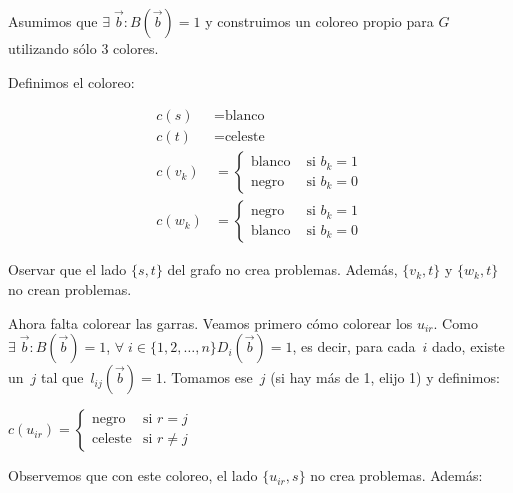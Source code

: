 \documentclass[10pt,a4paper]{article}
\begin{document}
Asumimos que $\exists\; \overrightarrow{b} : B(\overrightarrow{b}) = 1$ y construimos un coloreo propio para $G$ utilizando sólo 3 colores.

Definimos el coloreo:

\begin{center}
\begin{align*} c(s) &= \text{blanco}\\ c(t) &= \text{celeste} \\ c(v_k) &= \begin{cases} \text{blanco} & \text{ si } b_k = 1\\ \text{negro} & \text{ si } b_k = 0 \end{cases}\\ c(w_k) &= \begin{cases} \text{negro} & \text{ si } b_k = 1\\ \text{blanco} & \text{ si } b_k = 0 \end{cases} \end{align*}
\end{center}

Oservar que el lado $\{s, t\}$ del grafo no crea problemas. Además, $\{v_k, t\}$ y $\{w_k, t\}$ no crean problemas.

Ahora falta colorear las garras. Veamos primero cómo colorear los $u_{ir}$. Como $\exists\; \overrightarrow{b} : B(\overrightarrow{b}) = 1$, $\forall\; i \in \{1, 2, \dots, n\} D_i(\overrightarrow{b}) = 1$, es decir, para cada $i$ dado, existe un $j$ tal que $ l_{ij}(\overrightarrow{b}) = 1$. Tomamos ese $j$ (si hay más de 1, elijo 1) y definimos:

\begin{center}
$c(u_{ir})= \begin{cases} \text{negro} & \text{si } r = j\\ \text{celeste} & \text{si } r \neq j \end{cases}$
\end{center}

Observemos que con este coloreo, el lado $\{u_{ir}, s\}$ no crea problemas. Además:
\end{document}
